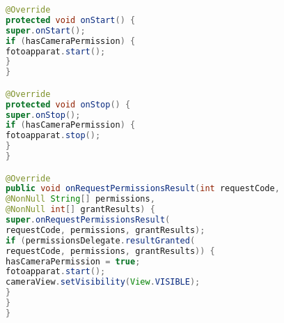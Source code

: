 \begin{lstlisting}[language=Java, caption=Implementasi Fitur Upload, label=code:upload, firstnumber=53, breaklines]
@Override
protected void onStart() {
super.onStart();
if (hasCameraPermission) {
fotoapparat.start();
}
}

@Override
protected void onStop() {
super.onStop();
if (hasCameraPermission) {
fotoapparat.stop();
}
}

@Override
public void onRequestPermissionsResult(int requestCode,
@NonNull String[] permissions,
@NonNull int[] grantResults) {
super.onRequestPermissionsResult(
requestCode, permissions, grantResults);
if (permissionsDelegate.resultGranted(
requestCode, permissions, grantResults)) {
hasCameraPermission = true;
fotoapparat.start();
cameraView.setVisibility(View.VISIBLE);
}
}
}
\end{lstlisting}
